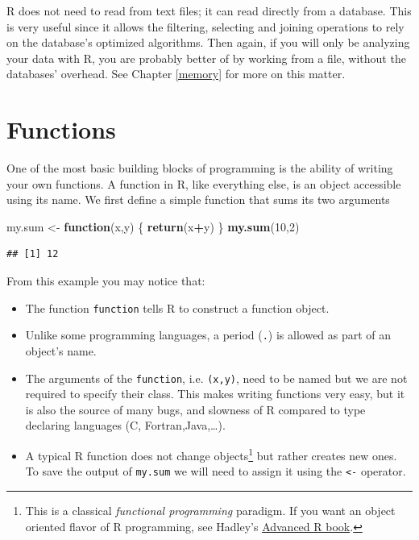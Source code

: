 \documentclass[]{book}
\newenvironment{Shaded}{\begin{snugshade}}{\end{snugshade}}
\newcommand{\KeywordTok}[1]{\textcolor[rgb]{0.13,0.29,0.53}{\textbf{#1}}}
\newcommand{\DecValTok}[1]{\textcolor[rgb]{0.00,0.00,0.81}{#1}}
\newcommand{\StringTok}[1]{\textcolor[rgb]{0.31,0.60,0.02}{#1}}
\newcommand{\ControlFlowTok}[1]{\textcolor[rgb]{0.13,0.29,0.53}{\textbf{#1}}}
\newcommand{\OperatorTok}[1]{\textcolor[rgb]{0.81,0.36,0.00}{\textbf{#1}}}
\newcommand{\NormalTok}[1]{#1}
\theoremstyle{definition}
\theoremstyle{definition}
\theoremstyle{definition}
\theoremstyle{remark}
\begin{document}
R does not need to read from text files; it can read directly from a
database. This is very useful since it allows the filtering, selecting
and joining operations to rely on the database's optimized algorithms.
Then again, if you will only be analyzing your data with R, you are
probably better of by working from a file, without the databases'
overhead. See Chapter \ref{memory} for more on this matter.

\section{Functions}\label{functions}

One of the most basic building blocks of programming is the ability of
writing your own functions. A function in R, like everything else, is an
object accessible using its name. We first define a simple function that
sums its two arguments

\begin{Shaded}
\begin{Highlighting}[]
\NormalTok{my.sum <-}\StringTok{ }\ControlFlowTok{function}\NormalTok{(x,y) \{}
  \KeywordTok{return}\NormalTok{(x}\OperatorTok{+}\NormalTok{y)}
\NormalTok{\}}
\KeywordTok{my.sum}\NormalTok{(}\DecValTok{10}\NormalTok{,}\DecValTok{2}\NormalTok{)}
\end{Highlighting}
\end{Shaded}

\begin{verbatim}
## [1] 12
\end{verbatim}

From this example you may notice that:

\begin{itemize}
\item
  The function \texttt{function} tells R to construct a function object.
\item
  Unlike some programming languages, a period (\texttt{.}) is allowed as
  part of an object's name.
\item
  The arguments of the \texttt{function}, i.e. \texttt{(x,y)}, need to
  be named but we are not required to specify their class. This makes
  writing functions very easy, but it is also the source of many bugs,
  and slowness of R compared to type declaring languages (C,
  Fortran,Java,\ldots{}).
\item
  A typical R function does not change objects\footnote{This is a
    classical \emph{functional programming} paradigm. If you want an
    object oriented flavor of R programming, see Hadley's
    \href{http://adv-r.had.co.nz/OO-essentials.html}{Advanced R book}.}
  but rather creates new ones. To save the output of \texttt{my.sum} we
  will need to assign it using the \texttt{\textless{}-} operator.
\end{itemize}
\end{document}
